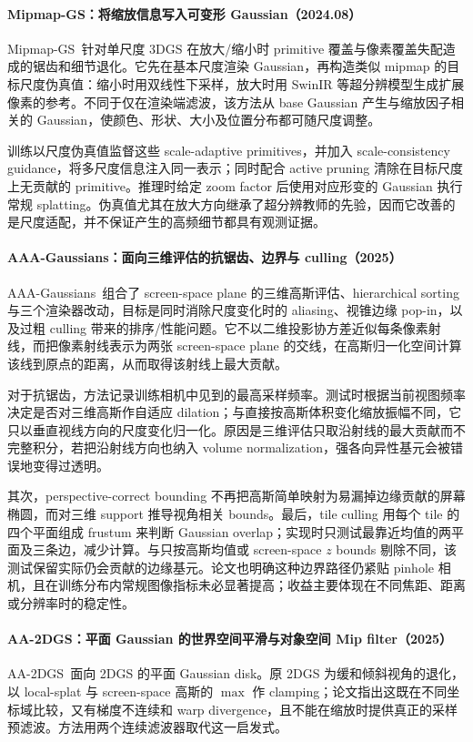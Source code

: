 \paragraph{Mipmap-GS：将缩放信息写入可变形 Gaussian（2024.08）}
Mipmap-GS~\cite{2408_06286}针对单尺度 3DGS 在放大/缩小时 primitive 覆盖与像素覆盖失配造成的锯齿和细节退化。它先在基本尺度渲染 Gaussian，再构造类似 mipmap 的目标尺度伪真值：缩小时用双线性下采样，放大时用 SwinIR 等超分辨模型生成扩展像素的参考。不同于仅在渲染端滤波，该方法从 base Gaussian 产生与缩放因子相关的 Gaussian，使颜色、形状、大小及位置分布都可随尺度调整。

训练以尺度伪真值监督这些 scale-adaptive primitives，并加入 scale-consistency guidance，将多尺度信息注入同一表示；同时配合 active pruning 清除在目标尺度上无贡献的 primitive。推理时给定 zoom factor 后使用对应形变的 Gaussian 执行常规 splatting。伪真值尤其在放大方向继承了超分辨教师的先验，因而它改善的是尺度适配，并不保证产生的高频细节都具有观测证据。


\paragraph{AAA-Gaussians：面向三维评估的抗锯齿、边界与 culling（2025）\cite{2504_12811}}
AAA-Gaussians~\cite{2504_12811}组合了 screen-space plane 的三维高斯评估、hierarchical sorting 与三个渲染器改动，目标是同时消除尺度变化时的 aliasing、视锥边缘 pop-in，以及过粗 culling 带来的排序/性能问题。它不以二维投影协方差近似每条像素射线，而把像素射线表示为两张 screen-space plane 的交线，在高斯归一化空间计算该线到原点的距离，从而取得该射线上最大贡献。

对于抗锯齿，方法记录训练相机中见到的最高采样频率。测试时根据当前视图频率决定是否对三维高斯作自适应 dilation；与直接按高斯体积变化缩放振幅不同，它只以垂直视线方向的尺度变化归一化。原因是三维评估只取沿射线的最大贡献而不完整积分，若把沿射线方向也纳入 volume normalization，强各向异性基元会被错误地变得过透明。

其次，perspective-correct bounding 不再把高斯简单映射为易漏掉边缘贡献的屏幕椭圆，而对三维 support 推导视角相关 bounds。最后，tile culling 用每个 tile 的四个平面组成 frustum 来判断 Gaussian overlap；实现时只测试最靠近均值的两平面及三条边，减少计算。与只按高斯均值或 screen-space $z$ bounds 剔除不同，该测试保留实际仍会贡献的边缘基元。论文也明确这种边界路径仍紧贴 pinhole 相机，且在训练分布内常规图像指标未必显著提高；收益主要体现在不同焦距、距离或分辨率时的稳定性。

\paragraph{AA-2DGS：平面 Gaussian 的世界空间平滑与对象空间 Mip filter（2025）\cite{2506_11252}}
AA-2DGS~\cite{2506_11252}面向 2DGS 的平面 Gaussian disk。原 2DGS 为缓和倾斜视角的退化，以 local-splat 与 screen-space 高斯的 $\max$ 作 clamping；论文指出这既在不同坐标域比较，又有梯度不连续和 warp divergence，且不能在缩放时提供真正的采样预滤波。方法用两个连续滤波器取代这一启发式。

